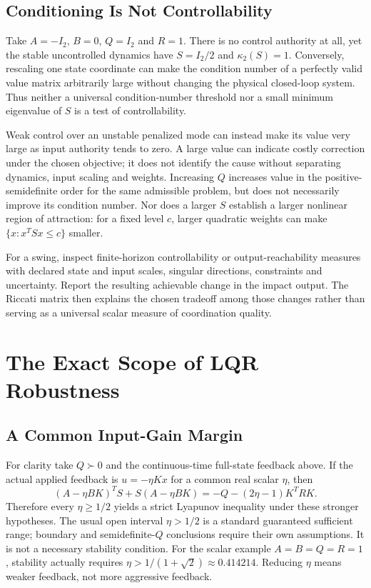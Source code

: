 \subsection{Conditioning Is Not Controllability}

Take $A=-I_2$, $B=0$, $Q=I_2$ and $R=1$. There is no control authority at all, yet the stable uncontrolled dynamics have $S=I_2/2$ and $\kappa_2(S)=1$. Conversely, rescaling one state coordinate can make the condition number of a perfectly valid value matrix arbitrarily large without changing the physical closed-loop system. Thus neither a universal condition-number threshold nor a small minimum eigenvalue of $S$ is a test of controllability.

Weak control over an unstable penalized mode can instead make its value very large as input authority tends to zero. A large value can indicate costly correction under the chosen objective; it does not identify the cause without separating dynamics, input scaling and weights. Increasing $Q$ increases value in the positive-semidefinite order for the same admissible problem, but does not necessarily improve its condition number. Nor does a larger $S$ establish a larger nonlinear region of attraction: for a fixed level $c$, larger quadratic weights can make $\{x:x^TSx\le c\}$ smaller.

For a swing, inspect finite-horizon controllability or output-reachability measures with declared state and input scales, singular directions, constraints and uncertainty. Report the resulting achievable change in the impact output. The Riccati matrix then explains the chosen tradeoff among those changes rather than serving as a universal scalar measure of coordination quality.

\section{The Exact Scope of LQR Robustness}

\subsection{A Common Input-Gain Margin}

For clarity take $Q\succ0$ and the continuous-time full-state feedback above. If the actual applied feedback is $u=-\eta Kx$ for a common real scalar $\eta$, then
\begin{equation}
(A-\eta BK)^TS+S(A-\eta BK)
=-Q-(2\eta-1)K^TRK.
\end{equation}
Therefore every $\eta\ge1/2$ yields a strict Lyapunov inequality under these stronger hypotheses. The usual open interval $\eta>1/2$ is a standard guaranteed sufficient range; boundary and semidefinite-$Q$ conclusions require their own assumptions. It is not a necessary stability condition. For the scalar example $A=B=Q=R=1$, stability actually requires $\eta>1/(1+\sqrt2)\approx0.414214$. Reducing $\eta$ means weaker feedback, not more aggressive feedback.

